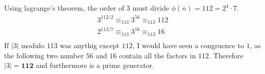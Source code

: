\documentclass{article}
\begin{document}
\subsection{}
Using lagrange's theorem, the order of 3 must divide $\phi(n) = 112 = 2^{4} \cdot 7$.
\[
\begin{split}
3^{112/2} \equiv_{113} 3^{56} \equiv_{113} 112 \\
2^{112/7} \equiv_{113} 3^{16} \equiv_{113} 16 \\
\end{split}
\]
If $|3|$ modulo $113$ was anythig except $112$, I would have seen a congruence to $1$, as the following two number $56$ and $16$ contain all the factors in $112$. Therefore $|3| = \textbf{112}$ and furthermore is a prime generator.
\end{document}

